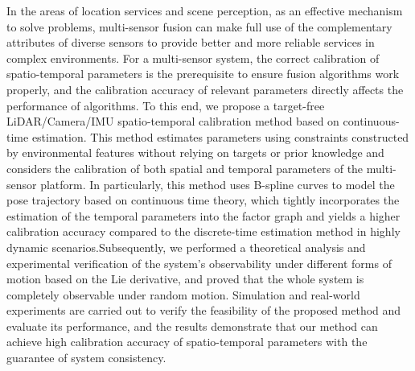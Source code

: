 
In the areas of location services and scene perception, as an effective mechanism to solve problems, multi-sensor fusion can make full use of the complementary attributes of diverse sensors to provide better and more reliable services in complex environments. For a multi-sensor system, the correct calibration of spatio-temporal parameters is the prerequisite to ensure fusion algorithms work properly, and the calibration accuracy of relevant parameters directly affects the performance of algorithms. To this end, we propose a target-free LiDAR/Camera/IMU spatio-temporal calibration method based on continuous-time estimation. This method estimates parameters using constraints constructed by environmental features without relying on targets or prior knowledge and considers the calibration of both spatial and temporal parameters of the multi-sensor platform. In particularly, this method uses B-spline curves to model the pose trajectory based on continuous time theory, which tightly incorporates the estimation of the temporal parameters into the factor graph and yields a higher calibration accuracy compared to the discrete-time estimation method in highly dynamic scenarios.Subsequently, we performed a theoretical analysis and experimental verification of the system's observability under different forms of motion based on the Lie derivative, and proved that the whole system is completely observable under random motion. Simulation and real-world experiments are carried out to verify the feasibility of the proposed method and evaluate its performance, and the results demonstrate that our method can achieve high calibration accuracy of spatio-temporal parameters with the guarantee of system consistency.